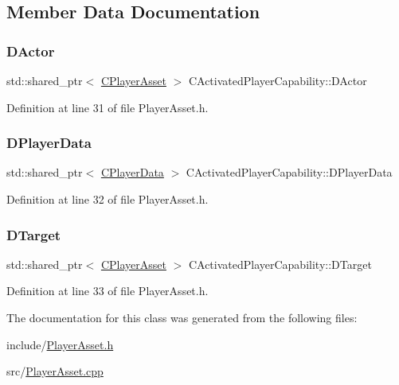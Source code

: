 \subsection{Member Data Documentation}
\hypertarget{classCActivatedPlayerCapability_a54ca944b47bff2718330639941d402b0}{}\label{classCActivatedPlayerCapability_a54ca944b47bff2718330639941d402b0} 
\subsubsection{\texorpdfstring{D\+Actor}{DActor}}
{\footnotesize\ttfamily std\+::shared\+\_\+ptr$<$ \hyperlink{classCPlayerAsset}{C\+Player\+Asset} $>$ C\+Activated\+Player\+Capability\+::\+D\+Actor\hspace{0.3cm}{\ttfamily [protected]}}



Definition at line 31 of file Player\+Asset.\+h.

\hypertarget{classCActivatedPlayerCapability_a9bf27c322a73f4b11c8183cc1973c3d8}{}\label{classCActivatedPlayerCapability_a9bf27c322a73f4b11c8183cc1973c3d8} 
\subsubsection{\texorpdfstring{D\+Player\+Data}{DPlayerData}}
{\footnotesize\ttfamily std\+::shared\+\_\+ptr$<$ \hyperlink{classCPlayerData}{C\+Player\+Data} $>$ C\+Activated\+Player\+Capability\+::\+D\+Player\+Data\hspace{0.3cm}{\ttfamily [protected]}}



Definition at line 32 of file Player\+Asset.\+h.

\hypertarget{classCActivatedPlayerCapability_a8a1cf50b6501bcfd55af0c935828e395}{}\label{classCActivatedPlayerCapability_a8a1cf50b6501bcfd55af0c935828e395} 
\subsubsection{\texorpdfstring{D\+Target}{DTarget}}
{\footnotesize\ttfamily std\+::shared\+\_\+ptr$<$ \hyperlink{classCPlayerAsset}{C\+Player\+Asset} $>$ C\+Activated\+Player\+Capability\+::\+D\+Target\hspace{0.3cm}{\ttfamily [protected]}}



Definition at line 33 of file Player\+Asset.\+h.



The documentation for this class was generated from the following files\+:\begin{DoxyCompactItemize}
\item 
include/\hyperlink{PlayerAsset_8h}{Player\+Asset.\+h}\item 
src/\hyperlink{PlayerAsset_8cpp}{Player\+Asset.\+cpp}\end{DoxyCompactItemize}
